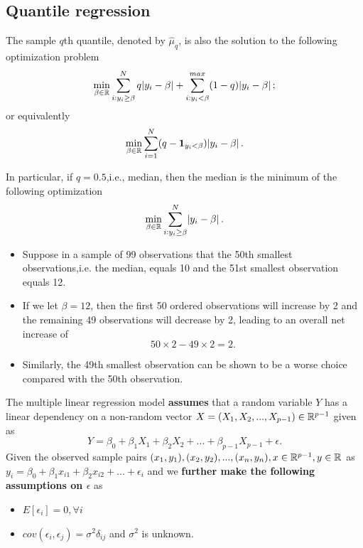 \begin{refsection}
\subsection{Quantile regression}

\begin{lemma}\cite[87]{cameron2005microeconometrics} 
The sample $q$th quantile, denoted by $\hat{\mu}_q$, is also the solution to the following optimization problem
$$\min_{\beta \in \mathbb{R}} \sum_{i:y_i\geq \beta}^{N} q\abs{y_i-\beta} + \sum_{i:y_i < \beta}^{max}(1-q)\abs{y_i-\beta};$$
or equivalently
$$\min_{\beta \in \mathbb{R}} \sum_{i=1}^{N} (q-\bm{1}_{y_i<\beta})\abs{y_i-\beta}.$$

In particular, if $q=0.5$,i.e., median, then the median is the minimum of the following optimization
$$\min_{\beta \in \mathbb{R}} \sum_{i:y_i\geq \beta}^{N} \abs{y_i-\beta}.$$
\end{lemma}


\begin{remark}\hfill
\begin{itemize}
	\item 
	Suppose in a sample of 99 observations that the 50th smallest observations,i.e. the median, equals 10 and the 51st smallest observation equals 12. 
	\item 
	If we let $\beta = 12$, then the first 50 ordered observations will increase by 2 and the remaining 49 observations will decrease by 2, leading to an overall net increase of $$50\times 2 - 49\times 2 = 2.$$
	\item Similarly, the 49th smallest observation can be shown to be a worse choice compared with the 50th observation.
\end{itemize}	 	
\end{remark}

\begin{definition}\cite[87]{cameron2005microeconometrics} 
	The multiple linear regression model \textbf{assumes} that a random variable $Y$ has a linear dependency on a non-random vector $X = (X_1,X_2,...,X_{p-1}) \in \mathbb{R}^{p-1}$ given as
	$$Y = \beta_0 + \beta_1 X_1 +\beta_2 X_2 + ... +\beta_{p-1} X_{p-1} + \epsilon.$$
	Given the observed sample pairs $(x_1,y_1),(x_2,y_2),..., (x_n,y_n), x\in \mathbb{R}^{p-1}, y\in \mathbb{R}$ as $y_i = \beta_0 + \beta_1 x_{i1} + \beta_2 x_{i2} + ... + \epsilon_i$ and we \textbf{further make the following assumptions on $\epsilon$} as
	\begin{itemize}
		\item $E[\epsilon_i] = 0,\forall i$
		\item $cov(\epsilon_i,\epsilon_j) = \sigma^2\delta_{ij}$ and $\sigma^2$ is unknown.
	\end{itemize} 	
	

\end{definition}
\end{refsection}

